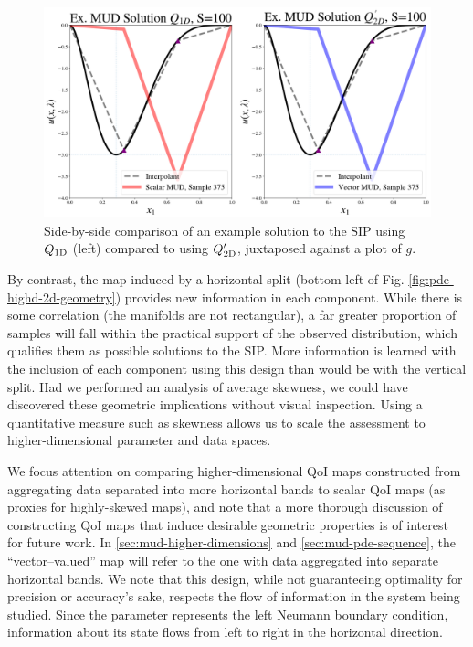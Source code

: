 \begin{figure}
  \includegraphics[width=0.95\linewidth]{figures/pde-highd/pde-highd_comp_exmud_D2_m100.png}
\caption{
Side-by-side comparison of an example solution to the SIP using $Q_\text{1D}$ (left) compared to using $Q_\text{2D}^\prime$, juxtaposed against a plot of $g$.
}
\label{fig:pde-highd-2d-scalar-vs-alt}
\end{figure}

By contrast, the map induced by a horizontal split (bottom left of Fig. \ref{fig:pde-highd-2d-geometry}) provides new information in each component.
While there is some correlation (the manifolds are not rectangular), a far greater proportion of samples will fall within the practical support of the observed distribution, which qualifies them as possible solutions to the SIP.
More information is learned with the inclusion of each component using this design than would be with the vertical split.
Had we performed an analysis of average skewness, we could have discovered these geometric implications without visual inspection.
Using a quantitative measure such as skewness allows us to scale the assessment to higher-dimensional parameter and data spaces.

We focus attention on comparing higher-dimensional QoI maps constructed from aggregating data separated into more horizontal bands to scalar QoI maps (as proxies for highly-skewed maps), and note that a more thorough discussion of constructing QoI maps that induce desirable geometric properties is of interest for future work.
In \ref{sec:mud-higher-dimensions} and \ref{sec:mud-pde-sequence}, the ``vector--valued'' map will refer to the one with data aggregated into separate horizontal bands.
We note that this design, while not guaranteeing optimality for precision or accuracy's sake, respects the flow of information in the system being studied.
Since the parameter represents the left Neumann boundary condition, information about its state flows from left to right in the horizontal direction.

\FloatBarrier
